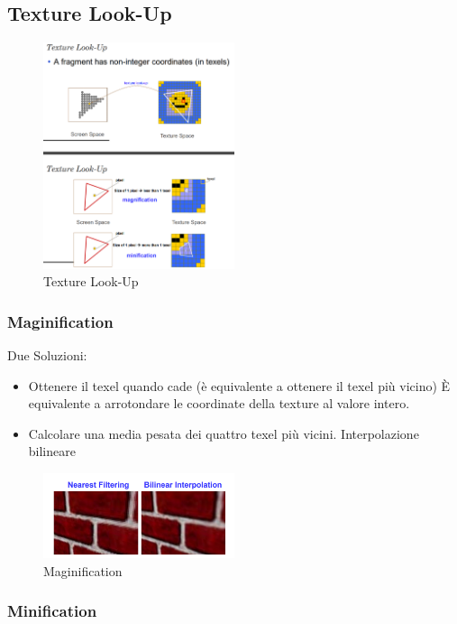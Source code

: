 \subsection{Texture Look-Up}
\begin{figure}[H]
    \centering
    \includegraphics[width=0.5\textwidth]{images/lookup.png} 
    \caption{Texture Look-Up}
    \label{fig:immagine}
\end{figure}
\subsubsection{Maginification}
Due Soluzioni:
\begin{itemize}
    \item 
    Ottenere il texel quando cade
    (è equivalente a ottenere
    il texel più vicino)
    È equivalente a arrotondare le coordinate della texture al valore intero.
    \item Calcolare una media pesata dei quattro texel più vicini.
    Interpolazione bilineare
\end{itemize}
\begin{figure}[H]
    \centering
    \includegraphics[width=0.5\textwidth]{images/magni.png} 
    \caption{Maginification}
    \label{fig:immagine}
\end{figure}
\subsubsection{Minification}
